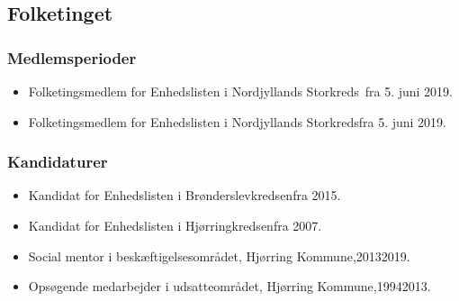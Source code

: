 \documentclass[11pt, a4paper]{awesome-cv}
\begin{document}
\begin{cvletter}
\subsection*{Folketinget}
\subsubsection*{Medlemsperioder}
\begin{itemize}
\item Folketingsmedlem for Enhedslisten i Nordjyllands Storkreds fra 5. juni 2019.
\item Folketingsmedlem for Enhedslisten i Nordjyllands Storkredsfra 5. juni 2019.
\end{itemize}
\subsubsection*{Kandidaturer}
\begin{itemize}
\item Kandidat for Enhedslisten i Brønderslevkredsenfra 2015.
\item Kandidat for Enhedslisten i Hjørringkredsenfra 2007.
\end{itemize}
\begin{itemize}
\item Social mentor i beskæftigelsesområdet, Hjørring Kommune,20132019.
\item Opsøgende medarbejder i udsatteområdet, Hjørring Kommune,19942013.
\end{itemize}
\end{cvletter}
\end{document}
